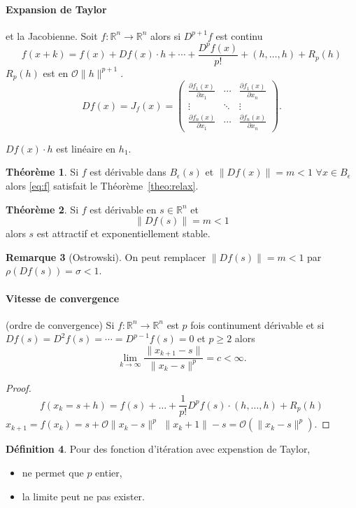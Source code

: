 \documentclass[11pt,a4paper]{article}
\newcommand{\R}{\mathbb{R}}
\newcommand{\Rn}{\R^n}
\theoremstyle{definition}
\newtheorem{mydef}{Définition}
\newtheorem{myrem}[mydef]{Remarque}
\newtheorem{mytheo}[mydef]{Théorème}
\newcommand{\bigoh}{\mathcal{O}}
\newcommand{\fpart}[2]{\frac{\partial #1}{\partial #2}}
\begin{document}
\paragraph{Expansion de Taylor} et la Jacobienne.
Soit $f : \Rn \to \Rn$ alors si $D^{p+1}f$ est continu
$$f(x+k) = f(x) + Df(x) \cdot h + \cdots + \frac{D^pf(x)}{p!} + (h,\ldots,h)
+ R_p(h)$$
$R_p(h)$ est en $\bigoh\|h\|^{p+1}$.
$$Df(x) = J_f(x) =
\begin{pmatrix}
  \fpart{f_1(x)}{x_1} & \cdots & \fpart{f_1(x)}{x_n}\\
  \vdots & \ddots & \vdots\\
  \fpart{f_n(x)}{x_1} & \cdots & \fpart{f_n(x)}{x_n}
\end{pmatrix}.$$

$Df(x) \cdot h$ est linéaire en $h_1$.

\begin{mytheo}
  Si $f$ est dérivable dans $B_\epsilon(s)$ et $\|Df(x)\| = m < 1$
  $\forall x \in B_\epsilon$ alors \eqref{eq:f} satisfait
  le Théorème~\ref{theo:relax}.
\end{mytheo}

\begin{mytheo}
  Si $f$ est dérivable en $s \in \Rn$ et
  $$\|Df(s)\| = m < 1$$
  alors $s$ est attractif et exponentiellement stable.
\end{mytheo}

\begin{myrem}[Ostrowski]
  On peut remplacer $\|Df(s)\| = m < 1$ par $\rho(Df(s)) = \sigma < 1$.
\end{myrem}

\paragraph{Vitesse de convergence} (ordre de convergence)
Si $f:\Rn\to\Rn$ est $p$ fois continument dérivable et si
$Df(s) = D^2f(s) = \cdots = D^{p-1}f(s) = 0$ et $p \geq 2$
alors
$$\lim_{k\to\infty}\frac{\|x_{k+1}-s\|}{\|x_k-s\|^p} = c < \infty.$$
\begin{proof}
  $$f(x_k=s+h)
  = f(s) + \ldots + \frac{1}{p!}D^pf(s) \cdot (h,\ldots,h)+R_p(h)$$
  $x_{k+1} = f(x_k) = s + \bigoh\|x_k-s\|^p$
  $\|x_k+1\| - s = \bigoh(\|x_k-s\|^p)$.
\end{proof}

\begin{mydef}
  Pour des fonction d'itération avec expenstion de Taylor,
  \begin{itemize}
    \item ne permet que $p$ entier,
    \item la limite peut ne pas exister.
  \end{itemize}
\end{mydef}
\end{document}
